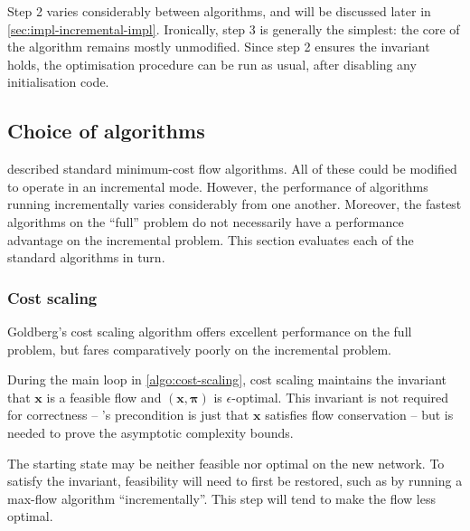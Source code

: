 Step 2 varies considerably between algorithms, and will be discussed later in \cref{sec:impl-incremental-impl}. Ironically, step 3 is generally the simplest: the core of the algorithm remains mostly unmodified. Since step 2 ensures the invariant holds, the optimisation procedure can be run as usual, after disabling any initialisation code.


\subsection{Choice of algorithms} \label{sec:impl-incremental-choice}
 described standard minimum-cost flow algorithms. All of these could be modified to operate in an incremental mode. However, the performance of algorithms running incrementally varies considerably from one another. Moreover, the fastest algorithms on the ``full'' problem do not necessarily have a performance advantage on the incremental problem. This section evaluates each of the standard algorithms in turn.

\subsubsection{Cost scaling} 
Goldberg's cost scaling algorithm offers excellent performance on the full problem, but fares comparatively poorly on the incremental problem. 

During the main loop in \cref{algo:cost-scaling}, cost scaling maintains the invariant that $\mathbf{x}$ is a feasible flow and $\left(\mathbf{x},\boldsymbol{\pi}\right)$ is $\epsilon$-optimal. This invariant is not required for correctness -- 's precondition is just that $\mathbf{x}$ satisfies flow conservation -- but is needed to prove the asymptotic complexity bounds.

The starting state may be neither feasible nor optimal on the new network. To satisfy the invariant, feasibility will need to first be restored, such as by running a max-flow algorithm ``incrementally''\footnotemark. This step will tend to make the flow less optimal.


